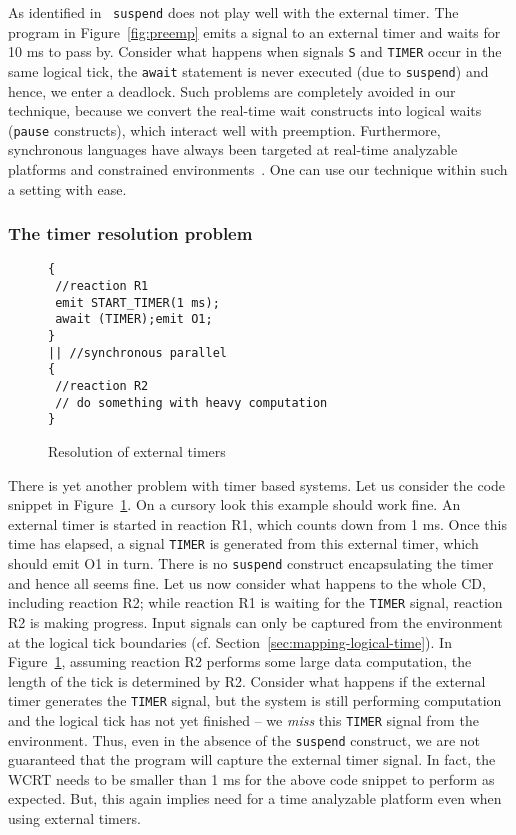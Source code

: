 As identified in~\cite{Bourke2009a} \texttt{suspend} does not play well
with the external timer. The program in Figure~\ref{fig:preemp} emits a
signal to an external timer and waits for 10 ms to pass by. Consider
what happens when signals \texttt{S} and \texttt{TIMER} occur in the
same logical tick, the \texttt{await} statement is never executed (due
to \texttt{suspend}) and hence, we enter a deadlock. Such problems are
completely avoided in our technique, because we convert the real-time
wait constructs into logical waits (\texttt{pause} constructs), which
interact well with preemption.  Furthermore, synchronous languages have
always been targeted at real-time analyzable platforms and constrained
environments~\cite{DBLP:journals/pieee/SifakisTY03,boldt07}. One can use
our technique within such a setting with ease.

\subsubsection{The timer resolution problem}
\label{sec:resolution-real-time}

\begin{figure}[h!]
  \centering
	\vspace{-10pt}
        \begin{lstlisting}[style=sysj,basicstyle=\footnotesize\ttfamily,morekeywords={emit,trap,pause,exit,delay,suspend,await}]
{
 //reaction R1
 emit START_TIMER(1 ms); 
 await (TIMER);emit O1;
}
|| //synchronous parallel
{
 //reaction R2
 // do something with heavy computation
}
		\end{lstlisting}
  \caption{Resolution of external timers}
  \label{fig:resolution}
	\vspace{-10pt}
\end{figure}

There is yet another problem with timer based systems. Let us consider
the code snippet in Figure~\ref{fig:resolution}. On a cursory look this
example should work fine. An external timer is started in reaction R1,
which counts down from 1 ms. Once this time has elapsed, a signal
\texttt{TIMER} is generated from this external timer, which should emit
O1 in turn. There is no \texttt{suspend} construct encapsulating the
timer and hence all seems fine. Let us now consider what happens to the
whole CD, including reaction R2; while reaction R1 is waiting for the
\texttt{TIMER} signal, reaction R2 is making progress. Input signals can
only be captured from the environment at the logical tick boundaries
(cf. Section~\ref{sec:mapping-logical-time}). In
Figure~\ref{fig:resolution}, assuming reaction R2 performs some large
data computation, the length of the tick is determined by R2. Consider
what happens if the external timer generates the \texttt{TIMER} signal,
but the system is still performing computation and the logical tick has
not yet finished -- we \textit{miss} this \texttt{TIMER} signal from the
environment. Thus, even in the absence of the \texttt{suspend}
construct, we are not guaranteed that the program will capture the
external timer signal. In fact, the WCRT needs to be smaller than 1 ms
for the above code snippet to perform as expected. But, this again
implies need for a time analyzable platform even when using external
timers.

